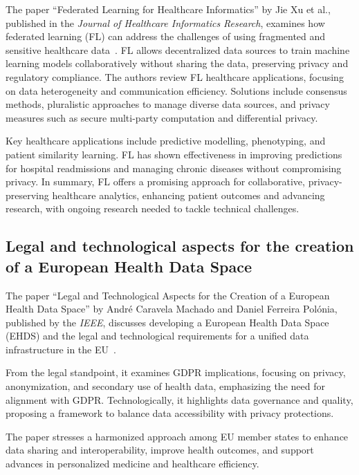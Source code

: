 The paper ``Federated Learning for Healthcare Informatics'' by Jie Xu et al., published in the \textit{Journal of Healthcare Informatics Research}, examines how federated learning (FL) can address the challenges of using fragmented and sensitive healthcare data~\cite{federated_learning_for_healthcare_infromatics}.
FL allows decentralized data sources to train machine learning models collaboratively without sharing the data, preserving privacy and regulatory compliance.
The authors review FL healthcare applications, focusing on data heterogeneity and communication efficiency.
Solutions include consensus methods, pluralistic approaches to manage diverse data sources, and privacy measures such as secure multi-party computation and differential privacy.

Key healthcare applications include predictive modelling, phenotyping, and patient similarity learning.
FL has shown effectiveness in improving predictions for hospital readmissions and managing chronic diseases without compromising privacy.
In summary, FL offers a promising approach for collaborative, privacy-preserving healthcare analytics, enhancing patient outcomes and advancing research, with ongoing research needed to tackle technical challenges.

\subsection[Legal and technological aspect for the creation of EHDS]{Legal and technological aspects for the creation of a European Health Data Space}\label{subsec:legal-and-technological-aspects-for-the-creation-of-a-european-health-data-space}

The paper ``Legal and Technological Aspects for the Creation of a European Health Data Space'' by André Caravela Machado and Daniel Ferreira Polónia, published by the \textit{IEEE}, discusses developing a European Health Data Space (EHDS) and the legal and technological requirements for a unified data infrastructure in the EU~\cite{legal_and_technological_aspects_of_ehds}.

From the legal standpoint, it examines GDPR implications, focusing on privacy, anonymization, and secondary use of health data, emphasizing the need for alignment with GDPR. Technologically, it highlights data governance and quality, proposing a framework to balance data accessibility with privacy protections.

The paper stresses a harmonized approach among EU member states to enhance data sharing and interoperability, improve health outcomes, and support advances in personalized medicine and healthcare efficiency.

